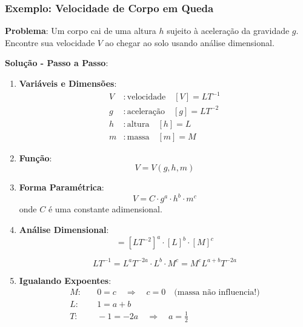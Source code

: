 \documentclass[12pt,a4paper,oneside]{book}
\theoremstyle{definition}
\begin{document}
\subsubsection{Exemplo: Velocidade de Corpo em Queda}

\textbf{Problema}: Um corpo cai de uma altura $h$ sujeito à aceleração da gravidade $g$. Encontre sua velocidade $V$ ao chegar ao solo usando análise dimensional.

\textbf{Solução - Passo a Passo}:

\begin{enumerate}
    \item \textbf{Variáveis e Dimensões}:
    \begin{align}
        V &: \text{velocidade} \quad [V] = LT^{-1} \\
        g &: \text{aceleração} \quad [g] = LT^{-2} \\
        h &: \text{altura} \quad [h] = L \\
        m &: \text{massa} \quad [m] = M
    \end{align}

    \item \textbf{Função}:
    \begin{equation}
        V = V(g, h, m)
    \end{equation}

    \item \textbf{Forma Paramétrica}:
    \begin{equation}
        V = C \cdot g^a \cdot h^b \cdot m^c
    \end{equation}
    onde $C$ é uma constante adimensional.

    \item \textbf{Análise Dimensional}:
    \begin{equation}
        [LT^{-1}] = [LT^{-2}]^a \cdot [L]^b \cdot [M]^c
    \end{equation}

    \begin{equation}
        LT^{-1} = L^a T^{-2a} \cdot L^b \cdot M^c = M^c L^{a+b} T^{-2a}
    \end{equation}

    \item \textbf{Igualando Expoentes}:
    \begin{align}
        M: & \quad 0 = c \quad \Rightarrow \quad c = 0 \quad \text{(massa não influencia!)} \\
        L: & \quad 1 = a + b \\
        T: & \quad -1 = -2a \quad \Rightarrow \quad a = \frac{1}{2}
    \end{align}


\end{enumerate}
\end{document}
